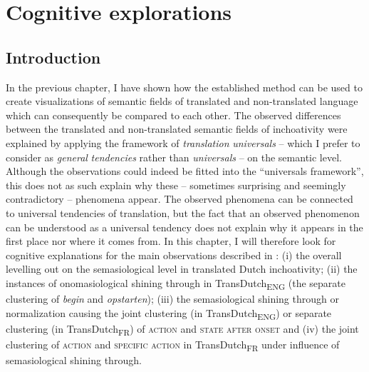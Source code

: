 \chapter{Cognitive explorations}
\label{sec:5}
\section{Introduction}
\label{sec:5.1}  
In the previous chapter, I have shown how the established method can be used to create visualizations of semantic fields of translated and non-translated language which can consequently be compared to each other. The observed differences between the translated and non-translated semantic fields of inchoativity were explained by applying the framework of \textit{translation} \textit{universals} – which I prefer to consider as \textit{general} \textit{tendencies} rather than \textit{universals} – on the semantic level. Although the observations could indeed be fitted into the “universals framework”, this does not as such explain why these – sometimes surprising and seemingly contradictory – phenomena appear. The observed phenomena can be connected to universal tendencies of translation, but the fact that an observed phenomenon can be understood as a universal tendency does not explain why it appears in the first place nor where it comes from. In this chapter, I will therefore look for cognitive explanations for the main observations described in : (i) the overall levelling out on the semasiological level in translated Dutch inchoativity; (ii) the instances of onomasiological shining through in TransDutch\textsubscript{ENG} (the separate clustering of \textit{begin} and \textit{opstarten}); (iii) the semasiological shining through or normalization causing the joint clustering (in TransDutch\textsubscript{ENG}) or separate clustering (in TransDutch\textsubscript{FR}) of \textsc{action} and \textsc{state after onset} and (iv) the joint clustering of \textsc{action} and \textsc{specific} \textsc{action} in TransDutch\textsubscript{FR} under influence of semasiological shining through.


